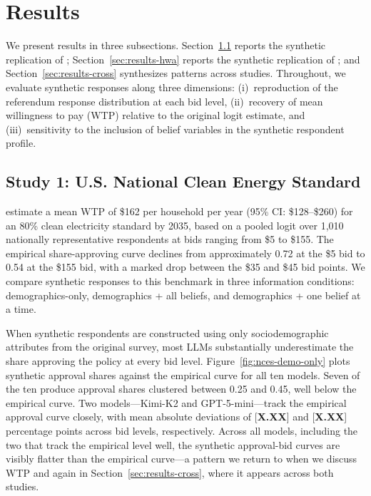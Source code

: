 \documentclass[12pt]{article}
\begin{document}
\section{Results}\label{sec:results}

We present results in three subsections. Section~\ref{sec:results-nces}
reports the synthetic replication of \textcite{Aldy2012};
Section~\ref{sec:results-hwa} reports the synthetic replication of
\textcite{Giguere2020}; and Section~\ref{sec:results-cross} synthesizes
patterns across studies. Throughout, we evaluate synthetic responses along
three dimensions: (i)~reproduction of the referendum response distribution
at each bid level, (ii)~recovery of mean willingness to pay (WTP) relative
to the original logit estimate, and (iii)~sensitivity to the inclusion of
belief variables in the synthetic respondent profile.

\subsection{Study 1: U.S. National Clean Energy Standard}\label{sec:results-nces}

\textcite{Aldy2012} estimate a mean WTP of \$162 per household per year
(95\% CI: \$128--\$260) for an 80\% clean electricity standard by 2035,
based on a pooled logit over 1{,}010 nationally representative respondents
at bids ranging from \$5 to \$155. The empirical share-approving curve
declines from approximately 0.72 at the \$5 bid to 0.54 at the \$155 bid,
with a marked drop between the \$35 and \$45 bid points. We compare
synthetic responses to this benchmark in three information conditions:
demographics-only, demographics + all beliefs, and demographics + one
belief at a time.

When synthetic respondents are constructed using only sociodemographic
attributes from the original survey, most LLMs substantially underestimate
the share approving the policy at every bid level.
Figure~\ref{fig:nces-demo-only} plots synthetic approval shares against
the empirical curve for all ten models. Seven of the ten produce approval
shares clustered between 0.25 and 0.45, well below the empirical curve.
Two models---Kimi-K2 and GPT-5-mini---track the empirical approval curve
closely, with mean absolute deviations of [\textbf{X.XX}] and
[\textbf{X.XX}] percentage points across bid levels, respectively. Across
all models, including the two that track the empirical level well, the
synthetic approval-bid curves are visibly flatter than the empirical
curve---a pattern we return to when we discuss WTP and again in
Section~\ref{sec:results-cross}, where it appears across both studies.
\end{document}
